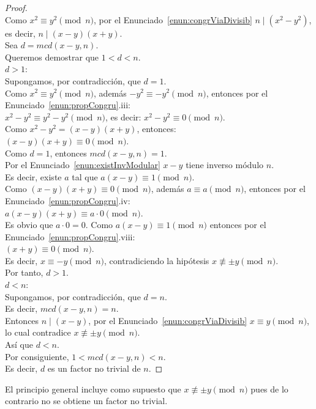 \begin{proof} \, \\
Como $x^2\equiv y^2\pmod n$, por el Enunciado~\ref{enun:congrViaDivisib} $n \mid (x^2-y^2)$, es decir, $n \mid (x-y)(x+y)$. \\
Sea $d=mcd(x-y,n)$. \\
Queremos demostrar que $1<d<n$. \\
$d>1$: \\
Supongamos, por contradicción, que $d=1$. \\
Como $x^2 \equiv y^2\pmod n$, además $-y^2  \equiv -y^2\pmod n$, entonces por el Enunciado~\ref{enun:propCongru}.iii: \\
$x^2-y^2 \equiv y^2-y^2 \pmod n$, es decir: $x^2-y^2 \equiv 0 \pmod n$. \\
Como $x^2-y^2 = (x-y)(x+y)$, entonces: \\
$(x-y)(x+y) \equiv 0 \pmod n$. \\
Como $d=1$, entonces $mcd(x-y,n)=1$. \\
Por el Enunciado~\ref{enun:existInvModular} $x-y$ tiene inverso módulo $n$. \\
Es decir, existe $a$ tal que $a(x-y) \equiv 1 \pmod n$. \\
Como $(x-y)(x+y) \equiv 0 \pmod n$, además $a \equiv a \pmod n$, entonces por el Enunciado~\ref{enun:propCongru}.iv: \\
$a(x-y)(x+y) \equiv a \cdot 0 \pmod n$. \\
Es obvio que $a \cdot 0 = 0$. Como $a(x-y) \equiv 1 \pmod n$ entonces por el Enunciado~\ref{enun:propCongru}.viii: \\
$(x+y) \equiv 0 \pmod n$. \\
Es decir, $x\equiv-y\pmod n$, contradiciendo la hipótesis $x \nequiv \pm y \pmod n$. \\
Por tanto, $d>1$. \\
$d<n$: \\
Supongamos, por contradicción, que $d=n$. \\
Es decir, $mcd(x-y,n)=n$. \\
Entonces $n \mid (x-y)$, por el Enunciado~\ref{enun:congrViaDivisib} $x \equiv y \pmod n$, lo cual contradice $x \nequiv \pm y \pmod n$. \\
Así que $d<n$. \\
Por consiguiente, $1< mcd(x-y,n) < n$. \\
Es decir, $d$ es un factor no trivial de $n$.
\end{proof}

El principio general incluye como supuesto que $x \nequiv \pm  y \pmod n$ pues de lo contrario no se obtiene un factor no trivial.

